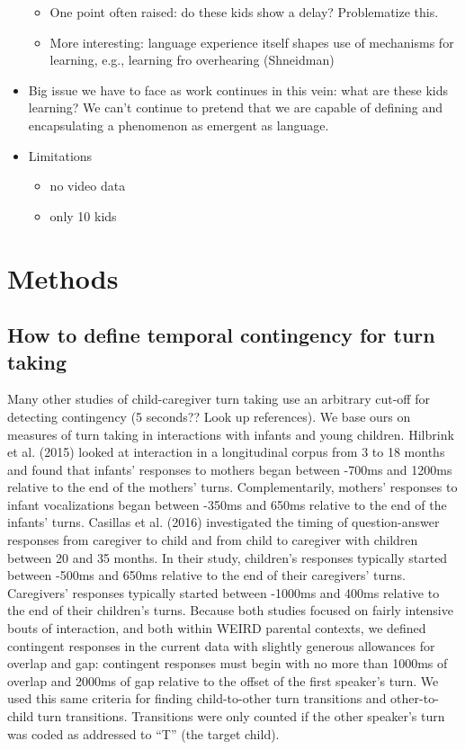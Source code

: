 \documentclass[man]{apa6}
\providecommand{\tightlist}{%
  \setlength{\itemsep}{0pt}\setlength{\parskip}{0pt}}
\theoremstyle{definition}
\theoremstyle{definition}
\theoremstyle{definition}
\theoremstyle{remark}
\begin{document}
\begin{itemize}
  \begin{itemize}
  \tightlist
  \item
    One point often raised: do these kids show a delay? Problematize
    this.
  \item
    More interesting: language experience itself shapes use of
    mechanisms for learning, e.g., learning fro overhearing (Shneidman)
  \end{itemize}
\item
  Big issue we have to face as work continues in this vein: what are
  these kids learning? We can't continue to pretend that we are capable
  of defining and encapsulating a phenomenon as emergent as language.
\item
  Limitations

  \begin{itemize}
  \tightlist
  \item
    no video data
  \item
    only 10 kids
  \end{itemize}
\end{itemize}

\section{Methods}\label{methods}

\subsection{How to define temporal contingency for turn
taking}\label{how-to-define-temporal-contingency-for-turn-taking}

Many other studies of child-caregiver turn taking use an arbitrary
cut-off for detecting contingency (5 seconds?? Look up references). We
base ours on measures of turn taking in interactions with infants and
young children. Hilbrink et al. (2015) looked at interaction in a
longitudinal corpus from 3 to 18 months and found that infants'
responses to mothers began between -700ms and 1200ms relative to the end
of the mothers' turns. Complementarily, mothers' responses to infant
vocalizations began between -350ms and 650ms relative to the end of the
infants' turns. Casillas et al. (2016) investigated the timing of
question-answer responses from caregiver to child and from child to
caregiver with children between 20 and 35 months. In their study,
children's responses typically started between -500ms and 650ms relative
to the end of their caregivers' turns. Caregivers' responses typically
started between -1000ms and 400ms relative to the end of their
children's turns. Because both studies focused on fairly intensive bouts
of interaction, and both within WEIRD parental contexts, we defined
contingent responses in the current data with slightly generous
allowances for overlap and gap: contingent responses must begin with no
more than 1000ms of overlap and 2000ms of gap relative to the offset of
the first speaker's turn. We used this same criteria for finding
child-to-other turn transitions and other-to-child turn transitions.
Transitions were only counted if the other speaker's turn was coded as
addressed to \enquote{T} (the target child).
\end{document}
